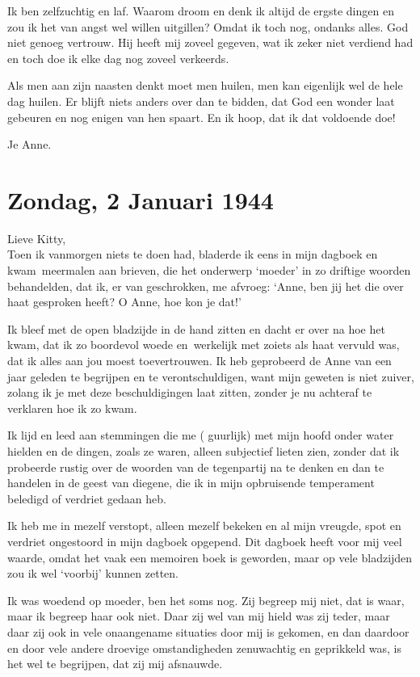 \documentclass{book}
\begin{document}
Ik ben zelfzuchtig en laf. Waarom droom en denk ik altijd de ergste
dingen en zou ik het van angst wel willen uitgillen? Omdat ik toch nog,
ondanks alles. God niet genoeg vertrouw. Hij heeft mij zoveel gegeven,
wat ik zeker niet verdiend had en toch doe ik elke dag nog zoveel
verkeerds.

Als men aan zijn naasten denkt moet men huilen, men kan eigenlijk wel de
hele dag huilen. Er blijft niets anders over dan te bidden, dat God een
wonder laat gebeuren en nog enigen van hen spaart. En ik hoop, dat ik
dat voldoende doe!

Je Anne.

\chapter{Zondag, 2 Januari 1944}

Lieve Kitty,\\Toen ik vanmorgen niets te doen had, bladerde ik eens in
mijn dagboek en kwam~meermalen aan brieven, die het onderwerp `moeder'
in zo driftige woorden behandelden, dat ik, er van geschrokken, me
afvroeg: `Anne, ben jij het die over haat gesproken heeft? O Anne, hoe
kon je dat!'

Ik bleef met de open bladzijde in de hand zitten en dacht er over na hoe
het kwam, dat ik zo boordevol woede en~werkelijk met zoiets als haat
vervuld was, dat ik alles aan jou moest toevertrouwen. Ik heb geprobeerd
de Anne van een jaar geleden te begrijpen en te verontschuldigen, want
mijn geweten is niet zuiver, zolang ik je met deze beschuldigingen laat
zitten, zonder je nu achteraf te verklaren hoe ik zo kwam.

Ik lijd en leed aan stemmingen die me ( guurlijk) met mijn hoofd onder
water hielden en de dingen, zoals ze waren, alleen subjectief lieten
zien, zonder dat ik probeerde rustig over de woorden van de tegenpartij
na te denken en dan te handelen in de geest van diegene, die ik in mijn
opbruisende temperament beledigd of verdriet gedaan heb.

Ik heb me in mezelf verstopt, alleen mezelf bekeken en al mijn vreugde,
spot en verdriet ongestoord in mijn dagboek opgepend. Dit dagboek heeft
voor mij veel waarde, omdat het vaak een memoiren boek is geworden, maar
op vele bladzijden zou ik wel `voorbij' kunnen zetten.

Ik was woedend op moeder, ben het soms nog. Zij begreep mij niet, dat is
waar, maar ik begreep haar ook niet. Daar zij wel van mij hield was zij
teder, maar daar zij ook in vele onaangename situaties door mij is
gekomen, en dan daardoor en door vele andere droevige omstandigheden
zenuwachtig en geprikkeld was, is het wel te begrijpen, dat zij mij
afsnauwde.
\end{document}
